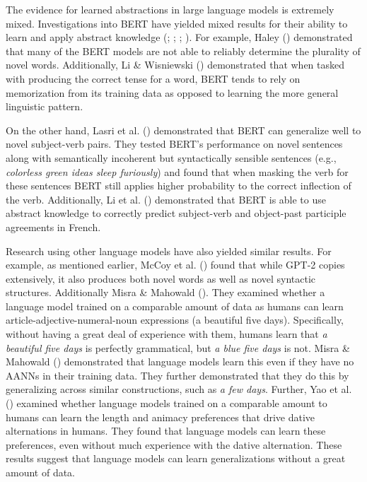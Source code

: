 \documentclass[
  12pt,
  letterpaper,
]{scrreprt}
\begin{document}
The evidence for learned abstractions in large language models is
extremely mixed. Investigations into BERT have yielded mixed results for
their ability to learn and apply abstract knowledge
(;
;
;
). For
example, Haley () demonstrated
that many of the BERT models are not able to reliably determine the
plurality of novel words. Additionally, Li \& Wisniewski
() demonstrated that when
tasked with producing the correct tense for a word, BERT tends to rely
on memorization from its training data as opposed to learning the more
general linguistic pattern.

On the other hand, Lasri et al.
() demonstrated that
BERT can generalize well to novel subject-verb pairs. They tested BERT's
performance on novel sentences along with semantically incoherent but
syntactically sensible sentences (e.g., \emph{colorless green ideas
sleep furiously}) and found that when masking the verb for these
sentences BERT still applies higher probability to the correct
inflection of the verb. Additionally, Li et al.
() demonstrated
that BERT is able to use abstract knowledge to correctly predict
subject-verb and object-past participle agreements in French.

Research using other language models have also yielded similar results.
For example, as mentioned earlier, McCoy et al.
() found that while GPT-2
copies extensively, it also produces both novel words as well as novel
syntactic structures. Additionally Misra \& Mahowald
(). They examined
whether a language model trained on a comparable amount of data as
humans can learn article-adjective-numeral-noun expressions (a beautiful
five days). Specifically, without having a great deal of experience with
them, humans learn that \emph{a beautiful five days} is perfectly
grammatical, but \emph{a blue five days} is not. Misra \& Mahowald
() demonstrated that
language models learn this even if they have no AANNs in their training
data. They further demonstrated that they do this by generalizing across
similar constructions, such as \emph{a few days}. Further, Yao et al.
() examined whether
language models trained on a comparable amount to humans can learn the
length and animacy preferences that drive dative alternations in humans.
They found that language models can learn these preferences, even
without much experience with the dative alternation. These results
suggest that language models can learn generalizations without a great
amount of data.
\end{document}
